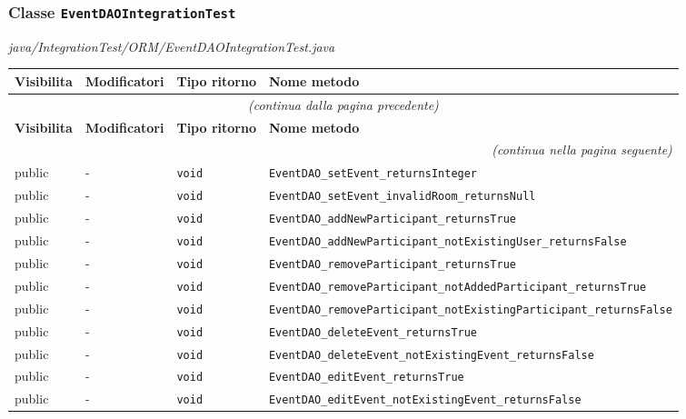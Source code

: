 \subsubsection*{Classe \texttt{EventDAOIntegrationTest}}\label{EventDAOIntegrationTest}
{\small\textit{java/IntegrationTest/ORM/EventDAOIntegrationTest.java}}
\vspace{4pt}

\begin{longtable}{@{}llll@{}}
\toprule
\textbf{Visibilita} & \textbf{Modificatori} & \textbf{Tipo ritorno} & \textbf{Nome metodo} \\
\midrule
\endfirsthead
\multicolumn{4}{c}{\small\itshape (continua dalla pagina precedente)} \\
\toprule
\textbf{Visibilita} & \textbf{Modificatori} & \textbf{Tipo ritorno} & \textbf{Nome metodo} \\
\midrule
\endhead
\midrule
\multicolumn{4}{r}{\small\itshape (continua nella pagina seguente)} \\
\endfoot
\bottomrule
\endlastfoot
  public & - & \texttt{void} & \texttt{EventDAO\_setEvent\_returnsInteger} \\
  public & - & \texttt{void} & \texttt{EventDAO\_setEvent\_invalidRoom\_returnsNull} \\
  public & - & \texttt{void} & \texttt{EventDAO\_addNewParticipant\_returnsTrue} \\
  public & - & \texttt{void} & \texttt{EventDAO\_addNewParticipant\_notExistingUser\_returnsFalse} \\
  public & - & \texttt{void} & \texttt{EventDAO\_removeParticipant\_returnsTrue} \\
  public & - & \texttt{void} & \texttt{EventDAO\_removeParticipant\_notAddedParticipant\_returnsTrue} \\
  public & - & \texttt{void} & \texttt{EventDAO\_removeParticipant\_notExistingParticipant\_returnsFalse} \\
  public & - & \texttt{void} & \texttt{EventDAO\_deleteEvent\_returnsTrue} \\
  public & - & \texttt{void} & \texttt{EventDAO\_deleteEvent\_notExistingEvent\_returnsFalse} \\
  public & - & \texttt{void} & \texttt{EventDAO\_editEvent\_returnsTrue} \\
  public & - & \texttt{void} & \texttt{EventDAO\_editEvent\_notExistingEvent\_returnsFalse} \\
\end{longtable}


